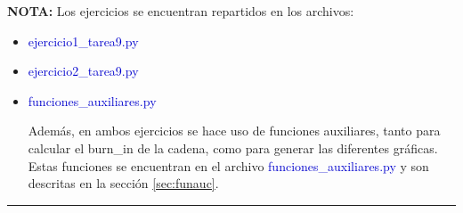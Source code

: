 \documentclass[a4paper,12pt]{article}
\begin{document}
\textcolor{BrickRed}{\bf NOTA:}  Los ejercicios se encuentran repartidos en los archivos:
\begin{itemize}
	\item \textcolor{mediumblue}{ejercicio1\_tarea9.py}
	\item \textcolor{mediumblue}{ejercicio2\_tarea9.py}
	\item \textcolor{mediumblue}{funciones\_auxiliares.py}
	
	Además, en ambos ejercicios se hace uso de funciones auxiliares, tanto para calcular el burn\_in de la cadena, como para generar las diferentes gráficas. Estas funciones se encuentran en el archivo \textcolor{mediumblue}{funciones\_auxiliares.py} y son descritas en la sección \ref{sec:funauc}.
\end{itemize}
\vspace{5mm}
{\color{gray} \hrule}





\end{document}
